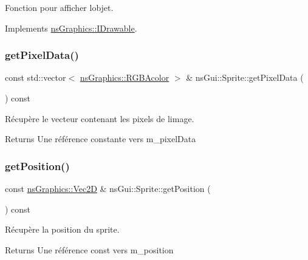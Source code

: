 Fonction pour afficher l\textquotesingle{}objet. 



Implements \hyperlink{classns_graphics_1_1_i_drawable_abed8a61e1d507d31e76f0891f3bf9c51}{ns\+Graphics\+::\+I\+Drawable}.

\mbox{\label{classns_gui_1_1_sprite_ad8644780a7a7dcbcd5f2e4e7a461b685}} 
\subsubsection{\texorpdfstring{get\+Pixel\+Data()}{getPixelData()}}
{\footnotesize\ttfamily const std\+::vector$<$ \hyperlink{classns_graphics_1_1_r_g_b_acolor}{ns\+Graphics\+::\+R\+G\+B\+Acolor} $>$ \& ns\+Gui\+::\+Sprite\+::get\+Pixel\+Data (\begin{DoxyParamCaption}{ }\end{DoxyParamCaption}) const}



Récupère le vecteur contenant les pixels de l\textquotesingle{}image. 

\begin{DoxyReturn}{Returns}
Une référence constante vers m\+\_\+pixel\+Data 
\end{DoxyReturn}
\mbox{\label{classns_gui_1_1_sprite_a1d6ad6681627aae6c4680fc936da8eb2}} 
\subsubsection{\texorpdfstring{get\+Position()}{getPosition()}}
{\footnotesize\ttfamily const \hyperlink{classns_graphics_1_1_vec2_d}{ns\+Graphics\+::\+Vec2D} \& ns\+Gui\+::\+Sprite\+::get\+Position (\begin{DoxyParamCaption}{ }\end{DoxyParamCaption}) const}



Récupère la position du sprite. 

\begin{DoxyReturn}{Returns}
Une référence const vers m\+\_\+position 
\end{DoxyReturn}
\mbox{\label{classns_gui_1_1_sprite_adbe04bd427b6658e0181ce167db83d05}} 
